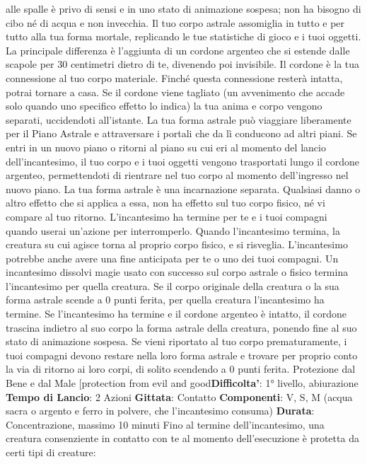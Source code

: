 \begin{multicols}{2}
alle spalle è privo di sensi e in uno stato di animazione
sospesa; non ha bisogno di cibo né di acqua e non
invecchia.
Il tuo corpo astrale assomiglia in tutto e per tutto alla tua
forma mortale, replicando le tue statistiche di gioco e i
tuoi oggetti. La principale differenza è l’aggiunta di un
cordone argenteo che si estende dalle scapole per 30
centimetri dietro di te, divenendo poi invisibile. Il
cordone è la tua connessione al tuo corpo materiale.
Finché questa connessione resterà intatta, potrai
tornare a casa. Se il cordone viene tagliato (un
avvenimento che accade solo quando uno specifico
effetto lo indica) la tua anima e corpo vengono separati,
uccidendoti all’istante.
La tua forma astrale può viaggiare liberamente per il
Piano Astrale e attraversare i portali che da lì
conducono ad altri piani. Se entri in un nuovo piano o
ritorni al piano su cui eri al momento del lancio
dell’incantesimo, il tuo corpo e i tuoi oggetti vengono
trasportati lungo il cordone argenteo, permettendoti di
rientrare nel tuo corpo al momento dell’ingresso nel
nuovo piano. La tua forma astrale è una incarnazione
separata. Qualsiasi danno o altro effetto che si applica
a essa, non ha effetto sul tuo corpo fisico, né vi
compare al tuo ritorno.
L’incantesimo ha termine per te e i tuoi compagni
quando userai un’azione per interromperlo. Quando
l’incantesimo termina, la creatura su cui agisce torna al
proprio corpo fisico, e si risveglia.
L’incantesimo potrebbe anche avere una fine anticipata
per te o uno dei tuoi compagni. Un incantesimo dissolvi
magie usato con successo sul corpo astrale o fisico
termina l’incantesimo per quella creatura. Se il corpo
originale della creatura o la sua forma astrale scende a
0 punti ferita, per quella creatura l’incantesimo ha
termine. Se l’incantesimo ha termine e il cordone
argenteo è intatto, il cordone trascina indietro al suo
corpo la forma astrale della creatura, ponendo fine al
suo stato di animazione sospesa.
Se vieni riportato al tuo corpo prematuramente, i tuoi
compagni devono restare nella loro forma astrale e
trovare per proprio conto la via di ritorno ai loro corpi, di
solito scendendo a 0 punti ferita.
Protezione dal Bene e dal Male
[protection from evil and good\textbf{Difficolta'}:
1° livello, abiurazione
\textbf{Tempo di Lancio}: 2 Azioni
\textbf{Gittata}: Contatto
\textbf{Componenti}: V, S, M (acqua sacra o argento e ferro in
polvere, che l’incantesimo consuma)
\textbf{Durata}: Concentrazione, massimo 10 minuti
Fino al termine dell’incantesimo, una creatura
consenziente in contatto con te al momento
dell’esecuzione è protetta da certi tipi di creature:

\end{multicols}
